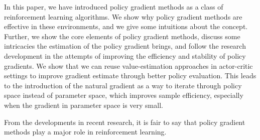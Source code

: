 In this paper, we have introduced policy gradient methods as a class of reinforcement learning algorithms. 
We show why policy gradient methods are effective in these environments, and we give some intuitions about the concept. 
Further, we show the core elements of policy gradient methods, discuss some intricacies the estimation of the policy gradient brings, and follow the research development in the attempts of improving the efficiency and stability of policy gradients.
We show that we can reuse value-estimation approaches in actor-critic settings to improve gradient estimate through better policy evaluation.
This leads to the introduction of the natural gradient as a way to iterate through policy space instead of parameter space, which improves sample efficiency, especially when the gradient in parameter space is very small.

From the developments in recent research, it is fair to say that policy gradient methods play a major role in reinforcement learning. 





